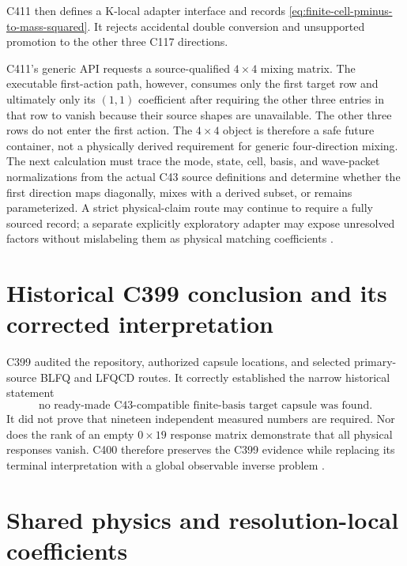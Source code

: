 \documentclass[11pt,oneside]{book}
\begin{document}
C411 then defines a K-local adapter interface and records \cref{eq:finite-cell-pminus-to-mass-squared}.  It rejects accidental double conversion and unsupported promotion to the other three C117 directions.

C411's generic API requests a source-qualified $4\times4$ mixing matrix.  The executable first-action path, however, consumes only the first target row and ultimately only its $(1,1)$ coefficient after requiring the other three entries in that row to vanish because their source shapes are unavailable.  The other three rows do not enter the first action.  The $4\times4$ object is therefore a safe future container, not a physically derived requirement for generic four-direction mixing.  The next calculation must trace the mode, state, cell, basis, and wave-packet normalizations from the actual C43 source definitions and determine whether the first direction maps diagonally, mixes with a derived subset, or remains parameterized.  A strict physical-claim route may continue to require a fully sourced record; a separate explicitly exploratory adapter may expose unresolved factors without mislabeling them as physical matching coefficients \cite{DWC401C410Record2026,DWC411Record2026,DWCurrentHandoff2026}.

\section{Historical C399 conclusion and its corrected interpretation}

C399 audited the repository, authorized capsule locations, and selected primary-source BLFQ and LFQCD routes.  It correctly established the narrow historical statement
\begin{equation}
 \boxed{\text{no ready-made C43-compatible finite-basis target capsule was found.}}
 \label{eq:c399-narrow}
\end{equation}
It did not prove that nineteen independent measured numbers are required.  Nor does the rank of an empty $0\times19$ response matrix demonstrate that all physical responses vanish.  C400 therefore preserves the C399 evidence while replacing its terminal interpretation with a global observable inverse problem \cite{DWC399Record2026,DWC400ScienceLock2026}.

\section{Shared physics and resolution-local coefficients}
\end{document}
